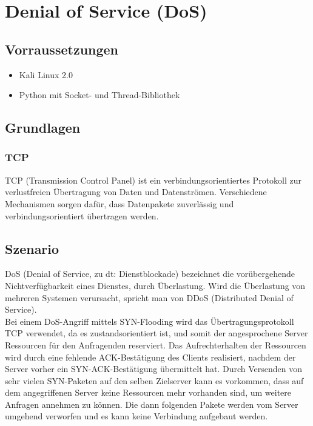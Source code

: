 \section{Denial of Service (DoS)}

\subsection*{Vorraussetzungen}

\begin{itemize}
\item Kali Linux 2.0
\item Python mit Socket- und Thread-Bibliothek
\end{itemize}


\subsection*{Grundlagen}

\subsubsection*{TCP}
TCP (Transmission Control Panel) ist ein verbindungsorientiertes Protokoll zur verlustfreien Übertragung von Daten und Datenströmen. Verschiedene Mechanismen sorgen dafür, dass Datenpakete zuverlässig und verbindungsorientiert übertragen werden.

\subsection*{Szenario}

DoS (Denial of Service, zu dt: Dienstblockade) bezeichnet die vorübergehende Nichtverfügbarkeit eines Dienstes, durch Überlastung. Wird die Überlastung von mehreren Systemen verursacht,
spricht man von DDoS (Distributed Denial of Service). \\
Bei einem DoS-Angriff mittels SYN-Flooding wird das Übertragungsprotokoll TCP verwendet, da es zustandsorientiert ist, und somit der angesprochene Server Ressourcen für den Anfragenden reserviert.
 Das Aufrechterhalten der Ressourcen wird durch eine fehlende ACK-Bestätigung des Clients realisiert, nachdem der Server vorher ein SYN-ACK-Bestätigung übermittelt hat. Durch Versenden von sehr vielen SYN-Paketen auf den selben Zielserver kann es vorkommen, dass auf dem angegriffenen Server keine Ressourcen mehr vorhanden sind, um weitere Anfragen annehmen zu können. Die dann folgenden Pakete werden vom Server umgehend verworfen und es kann keine Verbindung aufgebaut werden. \cite{dnssec}


